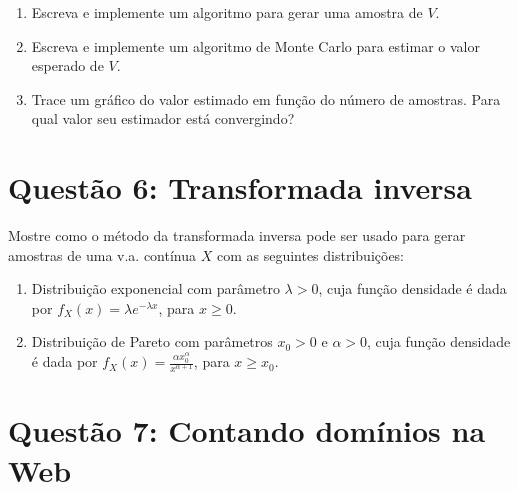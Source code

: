 \documentclass[12 pt]{article}
\begin{document}
\begin{enumerate}
    \item Escreva e implemente um algoritmo para gerar uma amostra de $V$.
    \begin{tcolorbox}[colframe=black, title=Resposta:]

    \end{tcolorbox}
    \item Escreva e implemente um algoritmo de Monte Carlo para estimar o valor esperado de $V$.
    \begin{tcolorbox}[colframe=black, title=Resposta:]

    \end{tcolorbox}
    \item Trace um gráfico do valor estimado em função do número de amostras. Para qual valor seu estimador está convergindo?
    \begin{tcolorbox}[colframe=black, title=Resposta:]

    \end{tcolorbox}
\end{enumerate}

\section*{Questão 6: Transformada inversa}

Mostre como o método da transformada inversa pode ser usado para gerar amostras de uma v.a. contínua $X$ com as seguintes distribuições:

\begin{enumerate}
    \item Distribuição exponencial com parâmetro $\lambda > 0$, cuja função densidade é dada por $f_X(x) = \lambda e^{-\lambda x}$, para $x \geq 0$.
    \begin{tcolorbox}[colframe=black, title=Resposta:]

    \end{tcolorbox}
    \item Distribuição de Pareto com parâmetros $x_0 > 0$ e $\alpha > 0$, cuja função densidade é dada por $f_X(x) = \frac{\alpha x_0^\alpha}{x^{\alpha + 1}}$, para $x \geq x_0$.
    \begin{tcolorbox}[colframe=black, title=Resposta:]

    \end{tcolorbox}
\end{enumerate}

\section*{Questão 7: Contando domínios na Web}
\end{document}
